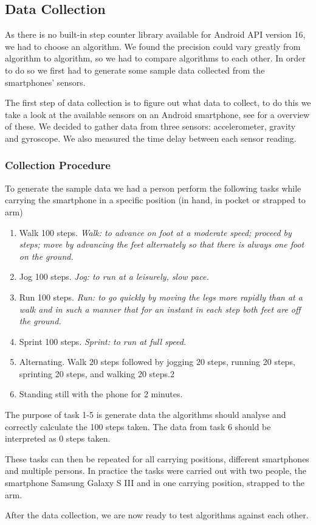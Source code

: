 \subsection{Data Collection}
As there is no built-in step counter library available for Android API version 16, we had to choose an algorithm. We found the precision could vary greatly from algorithm to algorithm, so we had to compare algorithms to each other. In order to do so we first had to generate some sample data collected from the smartphones' sensors. 

The first step of data collection is to figure out what data to collect, to do this we take a look at the available sensors on an Android smartphone, see \citet{android:sensor} for a overview of these. We decided to gather data from three sensors: accelerometer, gravity and gyroscope. We also measured the time delay between each sensor reading.

\subsubsection{Collection Procedure}
To generate the sample data we had a person perform the following tasks while carrying the smartphone in a specific position (in hand, in pocket or strapped to arm)
\begin{enumerate}
\item Walk 100 steps. \textit{Walk: to advance on foot at a moderate speed; proceed by steps; move by advancing the feet alternately so that there is always one foot on the ground.} %
\item Jog 100 steps. \textit{Jog: to run at a leisurely, slow pace.} %
\item Run 100 steps. \textit{Run: to go quickly by moving the legs more rapidly than at a walk and in such a manner that for an instant in each step both feet are off the ground.} %
\item Sprint 100 steps. \textit{Sprint: to run at full speed.} %
\item Alternating. Walk 20 steps followed by jogging 20 steps, running 20 steps, sprinting 20 steps, and walking 20 steps.2
\item Standing still with the phone for 2 minutes.
\end{enumerate}

The purpose of task 1-5 is generate data the algorithms should analyse and correctly calculate the 100 steps taken. The data from task 6 should be interpreted as 0 steps taken.

These tasks can then be repeated for all carrying positions, different smartphones and multiple persons. In practice the tasks were carried out with two people, the smartphone Samsung Galaxy S III and in one carrying position, strapped to the arm.

After the data collection, we are now ready to test algorithms against each other.